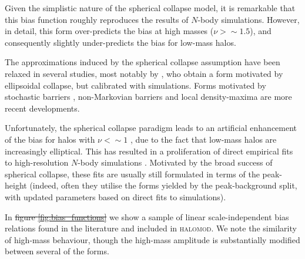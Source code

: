 \documentclass[5p,aas_macros]{elsarticle}
\newcommand{\halomod}{\textsc{halomod}\xspace} %
\providecommand{\DIFaddtex}[1]{{\protect\color{blue}\uwave{#1}}} %
\providecommand{\DIFdeltex}[1]{{\protect\color{red}\sout{#1}}}                      %
\providecommand{\DIFaddbegin}{} %
\providecommand{\DIFaddend}{} %
\providecommand{\DIFdelbegin}{} %
\providecommand{\DIFdelend}{} %
\providecommand{\DIFadd}[1]{\texorpdfstring{\DIFaddtex{#1}}{#1}} %
\providecommand{\DIFdel}[1]{\texorpdfstring{\DIFdeltex{#1}}{}} %
\begin{document}
Given the simplistic nature of the spherical collapse model, it is remarkable that this bias function roughly reproduces the results of $N$-body simulations. However, in detail, this form over-predicts the bias at high masses ($\nu >\sim1.5$), and consequently slightly under-predicts the bias for low-mass halos. 

The approximations induced by the spherical collapse assumption have been relaxed in several studies, most notably by \citet{Sheth2001}, who obtain a form motivated by ellipsoidal collapse, but calibrated with simulations. Forms motivated by stochastic barriers \citep{Corasaniti2011}, non-Markovian barriers \citep{Ma2011} and local density-maxima \citep{Paranjape2013a} are more recent developments.

Unfortunately, the spherical collapse paradigm leads to an artificial enhancement of the bias for halos with \DIFdelbegin \DIFdel{$\nu < \sim 1$ }\DIFdelend \DIFaddbegin \DIFadd{$\nu \lesssim 1$ }\DIFaddend \citep{Manera2010,Tinker2010}, due to the fact that low-mass halos are increasingly elliptical. This has resulted in a proliferation of direct empirical fits to high-resolution $N$-body simulations \citep{Jing1998,Jing1999,Seljak2004,Tinker2005,Mandelbaum2005,Pillepich2010}.
Motivated by the broad success of spherical collapse, these fits are usually \citep[but see][]{Jing1998,Seljak2004} still formulated in terms of the peak-height (indeed, often they utilise the forms yielded by the peak-background split, with updated parameters based on direct fits to simulations).

In \DIFdelbegin \DIFdel{figure \ref{fig:bias_functions} }\DIFdelend \DIFaddbegin \DIFadd{\mbox{%
\cref{fig:bias_functions} }\hspace{0pt}%
}\DIFaddend we show a sample of linear scale-independent bias relations found in the literature and included in \halomod. We note the similarity of high-mass behaviour, though the high-mass amplitude is substantially modified between several of the forms. 
\end{document}
